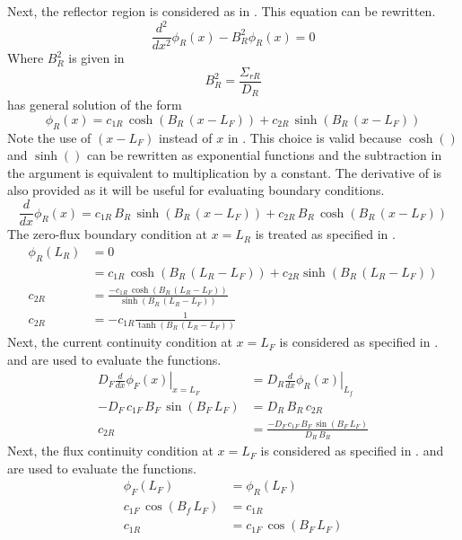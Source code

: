   Next, the reflector region is considered as in . This equation
  can be rewritten.
  \begin{equation}
    \label{eq:2regR_buckle}
    \frac{d^2}{dx^2} \phi_R(x) - B_R^2 \phi_R(x) = 0
  \end{equation}
  Where $B_R^2$ is given in 
  \begin{equation}
    \label{eq:2regR_b2}
    B_R^2 = \frac{\Sigma_{rR}}{D_R}
  \end{equation}
   has general solution of the form
  \begin{equation}
    \label{eq:2regR_general}
    \phi_R(x) = c_{1R} \, \cosh(B_R\, (x-L_F)) + c_{2R} \, \sinh(B_R\,(x-L_F))
  \end{equation}
  Note the use of $(x-L_F)$ instead of $x$ in . This
  choice is valid because $\cosh()$ and $\sinh()$ can be rewritten as
  exponential functions and the subtraction in the argument is equivalent to
  multiplication by a constant.
  The derivative of  is also provided as it will be
  useful for evaluating boundary conditions.
  \begin{equation}
    \label{eq:2regR_general_derivative}
    \frac{d}{dx} \phi_R(x) = c_{1R} \, B_R \, \sinh(B_R \, (x-L_F)) + 
      c_{2R} \, B_R \, \cosh(B_R \, (x-L_F))
  \end{equation}
  The zero-flux boundary condition at $x=L_R$ is treated as specified in
  .
  \begin{align}
    \phi_R(L_R) &= 0 \\
    &= c_{1R} \, \cosh(B_R \, (L_R - L_F)) + c_{2R} \sinh(B_R \, (L_R-L_F)) \\
    c_{2R} &= \frac{-c_{1R}\,\cosh(B_R\,(L_R - L_F))}{\sinh(B_R \,(L_R-L_F))} \\
    \label{eq:2reg_c2r_a}
    c_{2R} &= -c_{1R} \frac{1}{\tanh(B_R\,(L_R-L_F))}
  \end{align}
  Next, the current continuity condition at $x=L_F$ is considered as specified
  in .  and
   are used to evaluate the functions.
  \begin{align}
    \left. D_F \frac{d}{dx} \phi_F(x) \right|_{x=L_F} &= 
      \left. D_R \frac{d}{dx} \phi_R(x) \right|_{L_f} \\
    -D_F \, c_{1F} \, B_F \, \sin(B_F \, L_F) &= D_R \, B_R \, c_{2R} \\
    \label{eq:2reg_c2r_b}
    c_{2R} &= \frac{-D_F \, c_{1F} \, B_F \, \sin(B_F \, L_F)}{D_R\,B_R}
  \end{align}
  Next, the flux continuity condition at $x=L_F$ is considered as specified in 
  .  and 
   are used to evaluate the functions.
  \begin{align}
    \phi_F(L_F) &= \phi_R(L_F) \\
    c_{1F} \, \cos(B_f \, L_F) &= c_{1R} \\
    \label{eq:2reg_c1r}
    c_{1R} &= c_{1F} \, \cos(B_F \, L_F)
  \end{align}

